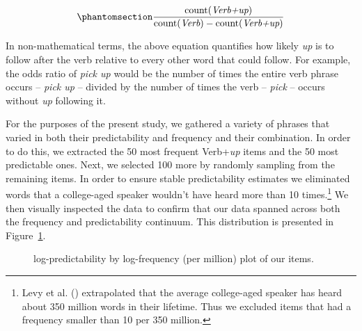 \documentclass[
  12pt,
  letterpaper,
]{scrreprt}
\begin{document}
\begin{equation}\phantomsection\label{eq-logodds}{
\frac{\mathrm{count(\textit{Verb+up})}}{\mathrm{count(\textit{Verb})} - \mathrm{count(\textit{Verb+up})}} 
}\end{equation}

In non-mathematical terms, the above equation quantifies how likely
\emph{up} is to follow after the verb relative to every other word that
could follow. For example, the odds ratio of \emph{pick up} would be the
number of times the entire verb phrase occurs -- \emph{pick up} --
divided by the number of times the verb -- \emph{pick} -- occurs without
\emph{up} following it.

For the purposes of the present study, we gathered a variety of phrases
that varied in both their predictability and frequency and their
combination. In order to do this, we extracted the 50 most frequent
Verb+\emph{up} items and the 50 most predictable ones. Next, we selected
100 more by randomly sampling from the remaining items. In order to
ensure stable predictability estimates we eliminated words that a
college-aged speaker wouldn't have heard more than 10 times.\footnote{Levy
  et al. ()
  extrapolated that the average college-aged speaker has heard about 350
  million words in their lifetime. Thus we excluded items that had a
  frequency smaller than 10 per 350 million.} We then visually inspected
the data to confirm that our data spanned across both the frequency and
predictability continuum. This distribution is presented in
Figure~\ref{fig-stimplot}.

\begin{figure}[htbp]

\caption{\label{fig-stimplot}log-predictability by log-frequency (per
million) plot of our items.}


\end{figure}%
\end{document}
